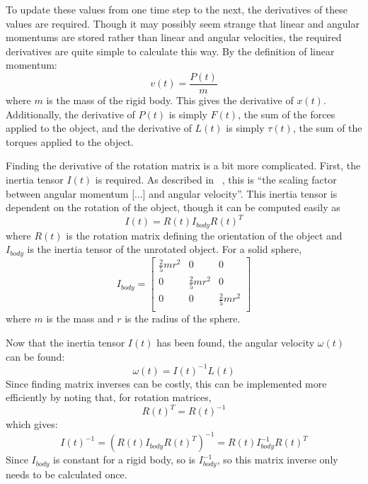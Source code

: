\documentclass[tog]{acmsiggraph}
\begin{document}
To update these values from one time step to the next, the derivatives of these values are required. Though it may possibly seem strange that linear and angular momentums are stored rather than linear and angular velocities, the required derivatives are quite simple to calculate this way. By the definition of linear momentum:
\begin{equation}
 v(t) = \frac{P(t)}{m}
\end{equation}
where $m$ is the mass of the rigid body. This gives the derivative of $x(t)$. Additionally, the derivative of $P(t)$ is simply $F(t)$, the sum of the forces applied to the object, and the derivative of $L(t)$ is simply $\tau(t)$, the sum of the torques applied to the object.

Finding the derivative of the rotation matrix is a bit more complicated. First, the inertia tensor $I(t)$ is required. As described in ~\cite{pixarnotes}, this is ``the scaling factor between angular momentum [...] and angular velocity''. This inertia tensor is dependent on the rotation of the object, though it can be computed easily as
\begin{equation}
 I(t) = R(t)I_{body}R(t)^{T}
\end{equation}
where $R(t)$ is the rotation matrix defining the orientation of the object and $I_{body}$ is the inertia tensor of the unrotated object. For a solid sphere,
\begin{equation}
 I_{body} =
   \begin{bmatrix}
   	\frac{2}{5}mr^2 & 0 & 0\\
   	0 & \frac{2}{5}mr^2 & 0\\
   	0 & 0 & \frac{2}{5}mr^2\\
   \end{bmatrix}
\end{equation}
where $m$ is the mass and $r$ is the radius of the sphere.

Now that the inertia tensor $I(t)$ has been found, the angular velocity $\omega(t)$ can be found:
\begin{equation}
\omega(t) = I(t)^{-1}L(t)
\end{equation}
Since finding matrix inverses can be costly, this can be implemented more efficiently by noting that, for rotation matrices,
\begin{equation}
R(t)^{T} = R(t)^{-1}
\end{equation}
which gives:
\begin{equation}
I(t)^{-1} = (R(t)I_{body}R(t)^{T})^{-1} = R(t)I_{body}^{-1}R(t)^{T}
\end{equation}
Since $I_{body}$ is constant for a rigid body, so is $I_{body}^{-1}$, so this matrix inverse only needs to be calculated once.
\end{document}
